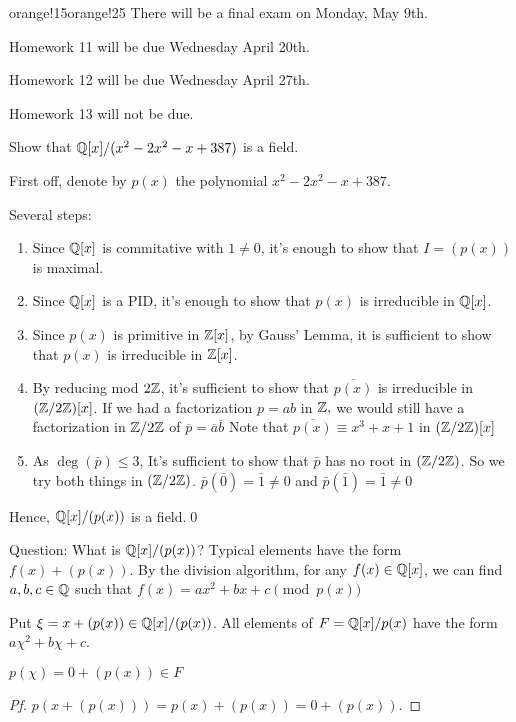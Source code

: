 \documentclass[notes.tex]{subfiles}
\begin{document}
\begin{classnote}{orange!15}{orange!25}
	There will be a final exam on Monday, May 9th.
	
	Homework 11 will be due Wednesday April 20th.

	Homework 12 will be due Wednesday April 27th.

	Homework 13 will not be due.
\end{classnote}

\begin{eg}
	Show that $\mathbb{Q}[x]/(x^2 - 2x^2 - x + 387)$ is a field.

	First off, denote by $p(x)$ the polynomial $x^2 - 2x^2 - x + 387$.

	Several steps:
	\begin{enumerate}
		\item Since $\mathbb{Q}[x]$ is commitative with $1\ne 0$, it's enough to show that $I = (p(x))$ is maximal.
		\item Since $\mathbb{Q}[x]$ is a PID, it's enough to show that $p(x)$ is irreducible in $\mathbb{Q}[x]$.
		\item Since $p(x)$ is primitive in $\mathbb{Z}[x]$, by Gauss' Lemma, it is sufficient to show that $p(x)$ is irreducible in $\mathbb{Z}[x]$.
		\item By reducing mod $2\mathbb{Z}$, it's sufficient to show that $\overline{p(x)}$ is irreducible in $(\mathbb{Z}/2\mathbb{Z})[x]$. If we had a factorization $p = ab$ in $\mathbb{Z},$ we would still have a factorization in $\mathbb{Z}/2\mathbb{Z}$ of $\overline p = \overline a\overline b$
		Note that $\overline{p(x)} \equiv {x^3 + x + 1}$ in $(\mathbb{Z}/2\mathbb{Z})[x]$
		\item As $\deg(\bar{p})\le 3$, It's sufficient to show that $\bar p$ has no root in $(\mathbb{Z}/{2}\mathbb{Z})$. So we try both things in $(\mathbb{Z}/{2}\mathbb{Z})$. $\bar p(\bar 0) = \bar 1\ne 0$ and $\bar p(\bar 1) = \bar1 \ne 0$
	\end{enumerate}
	Hence, $\mathbb{Q}[x]/(p(x))$ is a field.\qed
\end{eg}

Question: What is $\mathbb{Q}[x]/(p(x))$?
Typical elements have the form $f(x) + (p(x))$.
By the division algorithm, for any $f(x) \in \mathbb{Q}[x]$, we can find $a,b,c\in \mathbb{Q}$ such that $f(x) = ax^2 + bx + c \pmod{p(x)}$

Put $\xi = x + (p(x))\in \mathbb{Q}[x]/(p(x))$.
All elements of $F = \mathbb{Q}[x]/p(x)$ have the form $a \chi^2 + b \chi + c$.
\begin{claim}
	$p(\chi) = 0 + (p(x))\in F$
\end{claim}
\begin{proof}[Pf]
	$p(x + (p(x))) = p(x) + (p(x)) = 0 + (p(x))$.
\end{proof}
\end{document}
